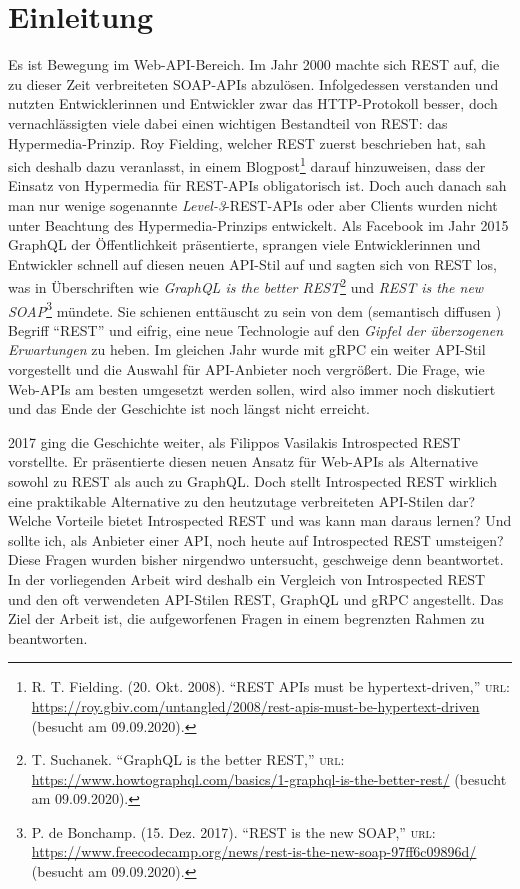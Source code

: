 \chapter{Einleitung}

Es ist Bewegung im Web-API-Bereich. Im Jahr 2000 machte sich REST auf, die zu dieser Zeit verbreiteten SOAP-APIs abzulösen. Infolgedessen verstanden und nutzten Entwicklerinnen und Entwickler zwar das HTTP-Protokoll besser, doch vernachlässigten viele dabei einen wichtigen Bestandteil von REST: das Hypermedia-Prinzip. Roy Fielding, welcher REST zuerst beschrieben hat, sah sich deshalb dazu veranlasst, in einem Blogpost\footnote{R. T. Fielding. (20. Okt. 2008). \enquote{REST APIs must be hypertext-driven,} \textsc{url}: \url{https://roy.gbiv.com/untangled/2008/rest-apis-must-be-hypertext-driven} (besucht am 09.09.2020).} darauf hinzuweisen, dass der Einsatz von Hypermedia für REST-APIs obligatorisch ist. Doch auch danach sah man nur wenige sogenannte \textit{Level-3}-REST-APIs \autocite{Richardson2008} oder aber Clients wurden nicht unter Beachtung des Hypermedia-Prinzips entwickelt. Als Facebook im Jahr 2015 GraphQL der Öffentlichkeit präsentierte, sprangen viele Entwicklerinnen und Entwickler schnell auf diesen neuen API-Stil auf und sagten sich von REST los, was in Überschriften wie \textit{GraphQL is the better REST}\footnote{T. Suchanek. \enquote{GraphQL is the better REST,} \textsc{url}: \url{https://www.howtographql.com/basics/1-graphql-is-the-better-rest/} (besucht am 09.09.2020).} und \textit{REST is the new SOAP}\footnote{P. de Bonchamp. (15. Dez. 2017). \enquote{REST is the new SOAP,} \textsc{url}: \url{https://www.freecodecamp.org/news/rest-is-the-new-soap-97ff6c09896d/} (besucht am 09.09.2020).} mündete. Sie schienen enttäuscht zu sein von dem (semantisch diffusen \autocite{Fowler2006}) Begriff \enquote{REST} und eifrig, eine neue Technologie auf den \textit{Gipfel der überzogenen Erwartungen} \autocite{HypeCycle} zu heben. Im gleichen Jahr wurde mit gRPC ein weiter API-Stil vorgestellt und die Auswahl für API-Anbieter noch vergrößert. Die Frage, wie Web-APIs am besten umgesetzt werden sollen, wird also immer noch diskutiert und das Ende der Geschichte ist noch längst nicht erreicht.

2017 ging die Geschichte weiter, als Filippos Vasilakis Introspected REST vorstellte. Er präsentierte diesen neuen Ansatz für Web-APIs als Alternative sowohl zu REST als auch zu GraphQL. Doch stellt Introspected REST wirklich eine praktikable Alternative zu den heutzutage verbreiteten API-Stilen dar? Welche Vorteile bietet Introspected REST und was kann man daraus lernen? Und sollte ich, als Anbieter einer API, noch heute auf Introspected REST umsteigen? Diese Fragen wurden bisher nirgendwo untersucht, geschweige denn beantwortet. In der vorliegenden Arbeit wird deshalb ein Vergleich von Introspected REST und den oft verwendeten API-Stilen REST, GraphQL und gRPC angestellt. Das Ziel der Arbeit ist, die aufgeworfenen Fragen in einem begrenzten Rahmen zu beantworten.

